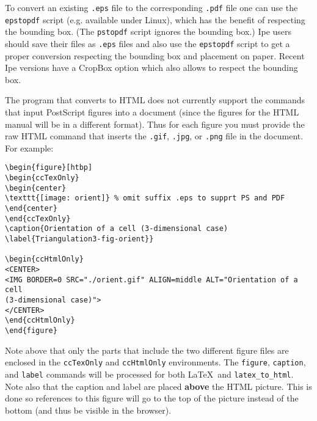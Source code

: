 To convert an existing \texttt{.eps} file to the corresponding
\texttt{.pdf} file one can use the
\texttt{epstopdf} script (e.g.
available under Linux), which has the benefit of respecting the
bounding box. (The \texttt{pstopdf}
script ignores the bounding box.)  Ipe users
should save their files as \texttt{.eps} files and also use the
\texttt{epstopdf} script to get a proper conversion respecting the
bounding box and placement on paper.  Recent Ipe versions have a
CropBox option which also allows to respect the bounding box.

The program that converts to HTML does not currently support
the commands that input PostScript figures into a document (since the figures
for the HTML manual will be in a different format).  Thus for each figure
you must provide the raw HTML command that inserts the {\tt .gif},
{\tt .jpg}, or {\tt .png} file in the
document.  For example:

\begin{verbatim}
\begin{figure}[htbp]
\begin{ccTexOnly}
\begin{center}
\texttt{[image: orient]} % omit suffix .eps to supprt PS and PDF
\end{center}
\end{ccTexOnly}
\caption{Orientation of a cell (3-dimensional case)
\label{Triangulation3-fig-orient}}

\begin{ccHtmlOnly}
<CENTER>
<IMG BORDER=0 SRC="./orient.gif" ALIGN=middle ALT="Orientation of a cell
(3-dimensional case)">
</CENTER>
\end{ccHtmlOnly}
\end{figure}
\end{verbatim}

Note above that only the parts that include the two different figure files
are enclosed in the {\tt ccTexOnly} and {\tt ccHtmlOnly} environments.
The {\tt figure}, {\tt caption}, and {\tt label} commands will be processed
for both \LaTeX\  and {\tt latex\_to\_html}.
Note also that the caption and label are placed {\bf above} the HTML picture.
This is done so references to this figure will go to the top of the picture
instead of the bottom (and thus be visible in the browser).


